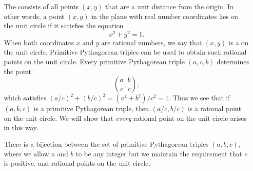 The  consists of all points $(x,y)$ that are a unit distance from the origin. In other words, a point $(x,y)$ in the plane with real number coordinates lies on the unit circle if it satisfies the equation
\begin{equation*}
  x^2+y^2=1.
\end{equation*}
When both coordinates $x$ and $y$ are rational numbers, we say that $(x,y)$ is a  on the unit circle. Primitive Pythagorean triples can be used to obtain such rational points on the unit circle. Every primitive Pythagorean triple $(a,c,b)$ determines the point
\begin{equation*}
  \left(\frac{a}{c},\frac{b}{c}\right),
\end{equation*}
which satisfies $(a/c)^2+(b/c)^2=(a^2+b^2)/c^2= 1$. Thus we see that if $(a,b,c)$ is a primitive Pythagorean triple, then $(a/c,b/c)$ is a rational point on the unit circle. We will show that \emph{every} rational point on the unit circle arises in this way.

\begin{theorem}\label{theorem:correspondence-rational-points-unit-circle}
  There is a bijection between the set of primitive Pythagorean triples $(a,b,c)$, where we allow $a$ and $b$ to be any integer but we maintain the requirement that $c$ is positive, and rational points on the unit circle.
\end{theorem}

